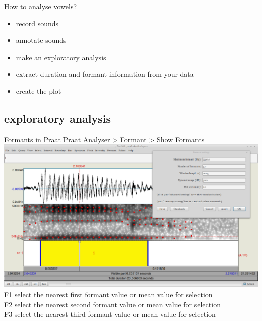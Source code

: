 \begin{frame}{How to analyse vowels?}
\begin{itemize}
\item[\checkmark] record sounds
\item[\checkmark] annotate sounds
\item make an exploratory analysis
\item extract duration and formant information from your data
\item create the plot
\end{itemize}
\end{frame}

\subsection{exploratory analysis}
\begin{frame}{Formants in Praat}
Praat Analyser > Formant > Show Formants\\
\includegraphics[width=\linewidth]{05-formnats.png}\\
F1 \hfill select the nearest first formant value or mean value for selection\\
F2 \hfill select the nearest second formant value or mean value for selection\\
F3 \hfill select the nearest third formant value or mean value for selection\\
\end{frame}

